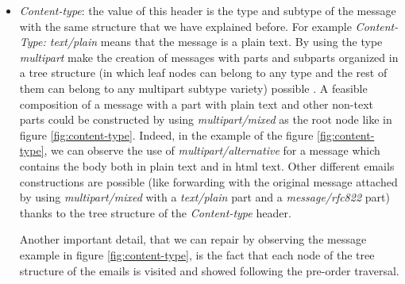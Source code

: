 \begin{itemize}
	\item\textit{Content-type}: the value of this header is the type and subtype of the message with the same structure that we have explained before. For example \textit{Content-Type: text/plain} means that the message is a plain text. By using the type \textit{multipart} make the creation of messages with parts and subparts organized in a tree structure (in which leaf nodes can belong to any type and the rest of them can belong to any multipart subtype variety) possible \citep{rfcmimemult}. A feasible composition of a message with a part with plain text and other non-text parts could be constructed by using \textit{multipart/mixed} as the root node like in figure \ref{fig:content-type}. Indeed, in the example of the figure \ref{fig:content-type}, we can observe the use of \textit{multipart/alternative} for a message which contains the body both in plain text and in html text. Other different emails constructions are possible (like forwarding with the original message attached by using \textit{multipart/mixed} with a \textit{text/plain} part and a \textit{message/rfc822} part) thanks to the tree structure of the \textit{Content-type} header.
	
	Another important detail, that we can repair by observing the message example in figure \ref{fig:content-type}, is the fact that each node of the tree structure of the emails is visited and showed following the pre-order traversal.
	

\end{itemize}
